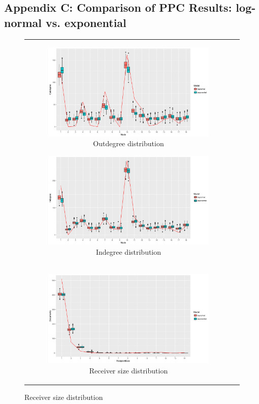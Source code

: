 \documentclass[ba]{imsart}
\numberwithin{equation}{section}
\theoremstyle{plain}
\begin{document}
	\subsection*{Appendix C: Comparison of PPC Results: log-normal vs. exponential}\label{appendix: PPCexp}
		\begin{figure}[H]
			\centering
			\begin{tabular}[t]{cc}
				\begin{subfigure}[b]{0.495\textwidth}
					\caption{Outdegree distribution}
					\includegraphics[width=\textwidth]{img/outdegree_two-1.png}	
				\end{subfigure}
				\begin{subfigure}[b]{0.495\textwidth}
					\caption{Indegree distribution}
					\includegraphics[width=\textwidth]{img/indegree_two-1.png}	
				\end{subfigure}\\
				\begin{subfigure}[b]{0.495\textwidth}
					\caption{Receiver size distribution}
					\includegraphics[width=\textwidth]{img/recipientsize_two-1.png}	

\end{subfigure}
\end{tabular}
\end{figure}
\end{document}
